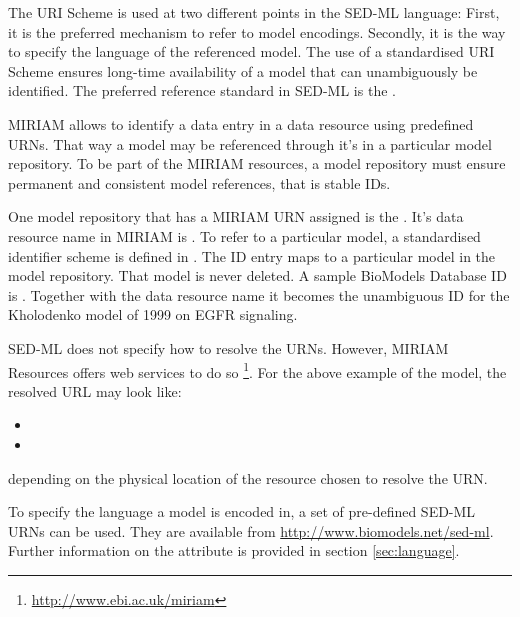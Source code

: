\label{sec:uriScheme}

The URI Scheme is used at two different points in the SED-ML \LoneVone language: First, it is the preferred mechanism to refer to model encodings. Secondly, it is the way to specify the language of the referenced model.
The use of a standardised URI Scheme ensures long-time availability  of a model that can unambiguously be identified. The preferred reference standard in SED-ML is the .

MIRIAM allows to identify a data entry in a data resource using predefined URNs. That way a  model may be referenced through it's  in a particular model repository. To be part of the MIRIAM resources, a model repository must ensure permanent and consistent model references, that is stable IDs.

One model repository that has a MIRIAM URN assigned is the . It's data resource name in MIRIAM is . To refer to a particular model, a standardised identifier scheme is defined in . The ID entry maps to a particular model in the model repository. That model is never deleted. 
A sample BioModels Database ID is . Together with the data resource name it becomes the unambiguous ID  for the Kholodenko model of 1999 on EGFR signaling. 
%

SED-ML does not specify how to resolve the URNs. However, MIRIAM Resources offers web services to do so \footnote{\url{http://www.ebi.ac.uk/miriam}}. For the above example of the  model, the resolved URL may look like: 
\begin{itemize}
 \item{}
 \item{}
\end{itemize}
depending on the physical location of the resource chosen to resolve the URN.


To specify the language a model is encoded in, a set of pre-defined SED-ML URNs can be used. They are available from \url{http://www.biomodels.net/sed-ml}. Further information on the  attribute is provided in section \ref{sec:language}.
